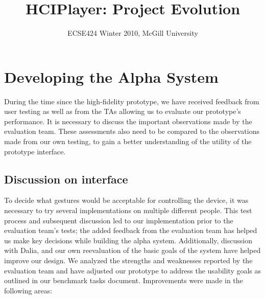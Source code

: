 \documentclass[10pt,letterpaper]{article}
\begin{document}
\title{HCIPlayer: Project Evolution}
\author{ECSE424 Winter 2010, McGill University}
\renewcommand{\today}{March 24th, 2010}
\maketitle


\section*{Developing the Alpha System}
During the time since the high-fidelity prototype, we have received feedback from user testing as well as from the TAs allowing us to evaluate our prototype's performance. It is necessary to discuss the important observations made by the evaluation team. These assessments also need to be compared to the observations made from our own testing, to gain a better understanding of the utility of the prototype interface.

\subsection*{Discussion on interface}
To decide what gestures would be acceptable for controlling the device, it was necessary to try several implementations on multiple different people. This test process and subsequent discussion led to our implementation prior to the evaluation team's tests; the added feedback from the evaluation team has helped us make key decisions while building the alpha system. Additionally, discussion with Dalia, and our own reevaluation of the basic goals of the system have helped improve our design. We analyzed the strengths and weaknesses reported by the evaluation team and have adjusted our prototype to address the usability goals as outlined in our benchmark tasks document. Improvements were made in the following areas:
\end{document}
